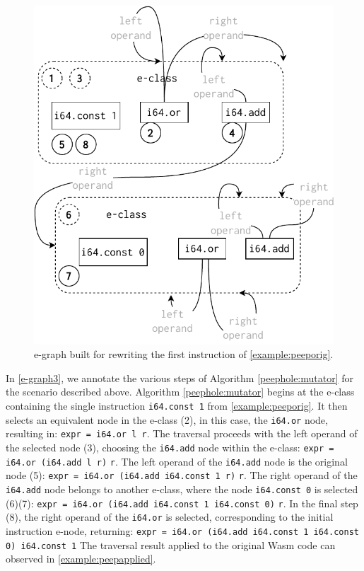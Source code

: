 %


\begin{figure}
    \centering
    \includegraphics[width=0.75\linewidth]{figures/egraph3.pdf}
    \caption{e-graph built for rewriting the first instruction of \autoref{example:peeporig}. }
  \label{e-graph3}
\end{figure}


In \autoref{e-graph3}, we annotate the various steps of Algorithm \ref{peephole:mutator} 
for the scenario  described above. Algorithm \ref{peephole:mutator} begins at the e-class containing the single instruction \texttt{i64.const 1} from \autoref{example:peeporig}. 
It then selects an equivalent node in the e-class (2), in this case, the \texttt{i64.or} node, resulting in:
{\texttt{expr = i64.or l r}}.
The traversal proceeds with the left operand of the selected node (3), choosing the \texttt{i64.add} node within the e-class: 
{\texttt{expr = i64.or (i64.add l r)} \texttt{r}}.
The left operand of the \texttt{i64.add} node is the original node (5): 
{\texttt{expr = i64.or (i64.add i64.const 1 r)} \texttt{r}}.
The right operand of the \texttt{i64.add} node belongs to another e-class, where the node \texttt{i64.const 0} is selected (6)(7):
{\texttt{expr = i64.or (i64.add i64.const 1 i64.const 0)} \texttt{r}}.
In the final step (8), the right operand of the \texttt{i64.or} is selected, corresponding to the initial instruction e-node, returning:
{\texttt{expr = i64.or (i64.add i64.const 1 i64.const 0)\ i64.const 1}}
The traversal result applied to the original Wasm code can observed in \autoref{example:peepapplied}. 



